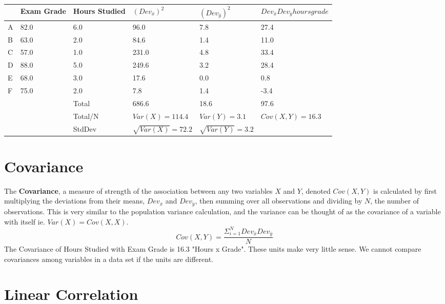 \documentclass[nohyper,justified]{tufte-handout}\usepackage[]{graphicx}\usepackage[]{color}
\newcommand{\dev}[1] {Dev_{\bar{#1}}}
\begin{document}
\begin{table}[ht]
\centering
\begin{tabular}{p{1.5cm}p{1.5cm}p{1.5cm}p{1.5cm}p{1.5cm}p{1.5cm}}
  \toprule
 & Exam Grade & Hours Studied & $(\dev{x})^2$ & $(\dev{y})^2$ & $\dev{x}\dev{y} hours grade $ \\ 
  \midrule
A & 82.0 & 6.0 & 96.0 & 7.8 & 27.4 \\ 
   \rowcolor[gray]{0.95}B & 63.0 & 2.0 & 84.6 & 1.4 & 11.0 \\ 
  C & 57.0 & 1.0 & 231.0 & 4.8 & 33.4 \\ 
   \rowcolor[gray]{0.95}D & 88.0 & 5.0 & 249.6 & 3.2 & 28.4 \\ 
  E & 68.0 & 3.0 & 17.6 & 0.0 & 0.8 \\ 
   \rowcolor[gray]{0.95}F & 75.0 & 2.0 & 7.8 & 1.4 & -3.4 \\ 
   \bottomrule
& & Total & 686.6& 18.6& 97.6  \\ 
\rowcolor[gray]{0.95}& & Total/N  &  $Var(X)=114.4$ & $Var(Y)= 3.1$ & $Cov(X,Y)=16.3$   \\ 
 & & StdDev &  $\sqrt{Var(X)}=72.2$ & $\sqrt{Var(Y)}= 3.2$ & \\ 
\end{tabular}
\caption{} 
\end{table}


\section{Covariance}
 The \textbf{Covariance}, a measure of strength of the association between any two variables $X$ and $Y$, denoted $Cov(X,Y)$ is calculated by first multiplying the deviations from their means, $\dev{x}$ and $\dev{y}$, then summing over all observations and dividing by $N$, the number of observations. This is very similar to the population variance calculation, and the variance can be thought of as the covariance of a variable with itself ie. $Var(X)=Cov(X,X)$. 
\begin{equation*}
Cov(X,Y)=\frac{\Sigma_{i=1}^{N} Dev_{\bar{x}}Dev_{\bar{y}}}{N}
\end{equation*}
The Covariance of Hours Studied with Exam Grade is 16.3 "Hours x Grade". These units make very little sense. We cannot compare covariances among variables in a data set if the units are different.

\section{Linear Correlation}
\end{document}
